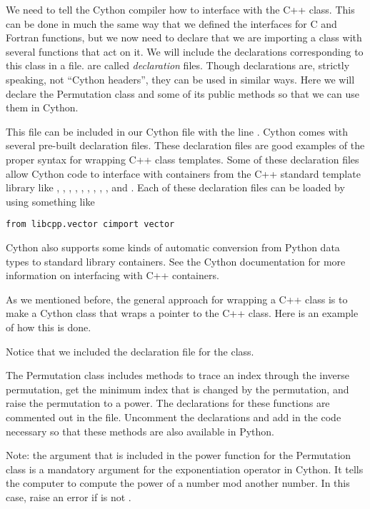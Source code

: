 We need to tell the Cython compiler how to interface with the C++ class.
This can be done in much the same way that we defined the interfaces for C and Fortran functions, but we now need to declare that we are importing a class with several functions that act on it.
We will include the declarations corresponding to this class in a  file.
 are called \emph{declaration} files.
Though declarations are, strictly speaking, not ``Cython headers'', they can be used in similar ways.
Here we will declare the Permutation class and some of its public methods so that we can use them in Cython.

This  file can be included in our Cython file with the line .
Cython comes with several pre-built declaration files.
These declaration files are good examples of the proper syntax for wrapping C++ class templates.
Some of these declaration files allow Cython code to interface with containers from the C++ standard template library like , , , , , , , , , and .
Each of these declaration files can be loaded by using something like
\begin{lstlisting}
from libcpp.vector cimport vector
\end{lstlisting}
Cython also supports some kinds of automatic conversion from Python data types to standard library containers.
See the Cython documentation for more information on interfacing with C++ containers.

As we mentioned before, the general approach for wrapping a C++ class is to make a Cython class that wraps a pointer to the C++ class.
Here is an example of how this is done.

Notice that we included the declaration file for the class.

\begin{problem}
The Permutation class includes methods to trace an index through the inverse permutation, get the minimum index that is changed by the permutation, and raise the permutation to a power.
The declarations for these functions are commented out in the  file.
Uncomment the declarations and add in the code necessary so that these methods are also available in Python.

Note: the argument  that is included in the power function for the Permutation class is a mandatory argument for the exponentiation operator in Cython.
It tells the computer to compute the power of a number mod another number.
In this case, raise an error if  is not .
\end{problem}